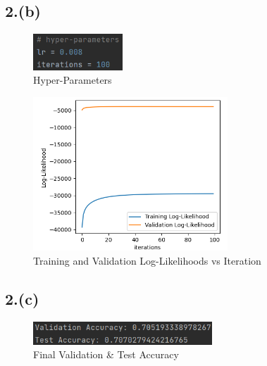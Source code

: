 \documentclass{article}
\begin{document}
\subsection*{2.(b)}

\begin{figure}[H]
    \centering
    \includegraphics[width=0.3\textwidth]{2(b)1.png}
    \caption{Hyper-Parameters}
\end{figure}
\begin{figure}[H]
    \centering
    \includegraphics[width=0.65\textwidth]{2(b)2.png}
    \caption{Training and Validation Log-Likelihoods vs Iteration}
\end{figure}

\subsection*{2.(c)}
\begin{figure}[H]
    \centering
    \includegraphics[width=0.6\textwidth]{2(c).png}
    \caption{Final Validation \& Test Accuracy}
\end{figure}
\end{document}
